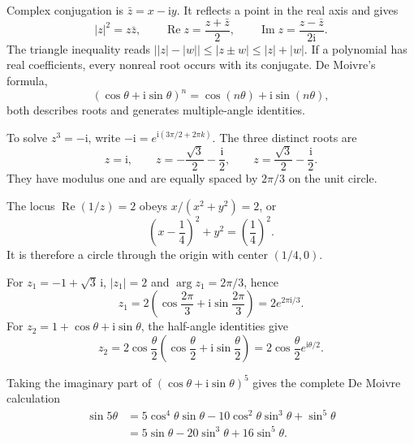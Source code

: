 Complex conjugation is $\bar z=x-\mathrm{i}y$. It reflects a point in the real axis and gives
\begin{equation}
|z|^2=z\bar z,\qquad
\operatorname{Re}z=\frac{z+\bar z}{2},\qquad
\operatorname{Im}z=\frac{z-\bar z}{2\mathrm{i}}.
\end{equation}
The triangle inequality reads $\bigl||z|-|w|\bigr|\leq|z\pm w|\leq|z|+|w|$.
If a polynomial has real coefficients, every nonreal root occurs with its conjugate. De Moivre's formula,
\begin{equation}
(\cos\theta+\mathrm{i}\sin\theta)^n=\cos(n\theta)+\mathrm{i}\sin(n\theta),
\end{equation}
both describes roots and generates multiple-angle identities.

\begin{example}
To solve $z^3=-\mathrm{i}$, write $-\mathrm{i}=e^{\mathrm{i}(3\pi/2+2\pi k)}$. The three distinct roots are
\begin{equation}
z=\mathrm{i},\qquad z=-\frac{\sqrt{3}}{2}-\frac{\mathrm{i}}{2},\qquad
z=\frac{\sqrt{3}}{2}-\frac{\mathrm{i}}{2}.
\end{equation}
They have modulus one and are equally spaced by $2\pi/3$ on the unit circle.
\end{example}

\begin{example}
The locus $\operatorname{Re}(1/z)=2$ obeys $x/(x^2+y^2)=2$, or
\begin{equation}
\left(x-\frac14\right)^2+y^2=\left(\frac14\right)^2.
\end{equation}
It is therefore a circle through the origin with center $(1/4,0)$.
\end{example}

\begin{example}
For $z_1=-1+\sqrt3\,\mathrm{i}$, $|z_1|=2$ and $\arg z_1=2\pi/3$, hence
\begin{equation}
z_1=2\left(\cos\frac{2\pi}{3}+\mathrm{i}\sin\frac{2\pi}{3}\right)=2e^{2\pi\mathrm{i}/3}.
\end{equation}
For $z_2=1+\cos\theta+\mathrm{i}\sin\theta$, the half-angle identities give
\begin{equation}
z_2=2\cos\frac\theta2\left(\cos\frac\theta2+\mathrm{i}\sin\frac\theta2\right)
=2\cos\frac\theta2e^{\mathrm{i}\theta/2}.
\end{equation}
\end{example}

Taking the imaginary part of $(\cos\theta+\mathrm{i}\sin\theta)^5$ gives the complete De Moivre calculation
\begin{align}
\sin5\theta
&=5\cos^4\theta\sin\theta-10\cos^2\theta\sin^3\theta+\sin^5\theta\nonumber\\
&=5\sin\theta-20\sin^3\theta+16\sin^5\theta.
\end{align}